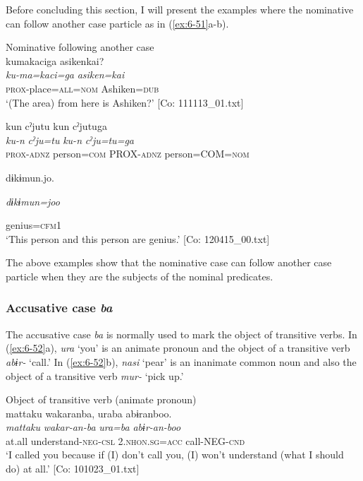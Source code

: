 \begin{table}
  Before concluding this section, I will present the examples where the nominative can follow another case particle as in (\ref{ex:6-51}a-b).

\ea\label{ex:6-51}
 Nominative following another case\\

 \ea {\TM}  kumakaciga  asikenkai?\\
\glll \textit{ku-ma=kaci=ga}  \textit{asiken=kai}\\
\textsc{prox}-place=\textsc{all}=\textsc{nom}  Ashiken=\textsc{dub}\\
\glt ‘(The area) from here is Ashiken?’ [Co: 111113\_01.txt]
\z

\ex {\TM}  kun  cˀjutu  kun  cˀjutuga\\
\glll \textit{ku-n}  \textit{cˀju=tu}  \textit{ku-n}  \textit{cˀju=tu=ga}\\
\textsc{prox}-\textsc{adnz}  person=\textsc{com}  PROX-\textsc{adnz}  person=COM=\textsc{nom}

      dɨkɨmun.jo.

      \textit{dɨkɨmun=joo}

      genius=\textsc{cfm}1\\
\glt ‘This person and this person are genius.’ [Co: 120415\_00.txt]
\z

The above examples show that the nominative case can follow another case particle when they are the subjects of the nominal predicates.

\subsubsection{Accusative case \textit{ba}}

The accusative case \textit{ba} is normally used to mark the object of transitive verbs. In (\ref{ex:6-52}a), \textit{ura} ‘you’ is an animate pronoun and the object of a transitive verb \textit{abɨr-} ‘call.’ In (\ref{ex:6-52}b), \textit{nasi} ‘pear’ is an inanimate common noun and also the object of a transitive verb \textit{mur-} ‘pick up.’

\ea\label{ex:6-52}
\ea Object of transitive verb (animate pronoun)\\
{\TM}
\glll  mattaku  wakaranba,  uraba  abɨranboo.\\
\textit{mattaku}  \textit{wakar-an-ba}  \textit{ura=ba}  \textit{abɨr-an-boo}\\
at.all  understand-\textsc{neg}-\textsc{csl}  2.\textsc{nhon}.\textsc{sg}=\textsc{acc}  call-NEG-\textsc{cnd}\\
\glt ‘I called you because if (I) don’t call you, (I) won’t understand (what I should do) at all.’ [Co: 101023\_01.txt]
\z


\end{table}
